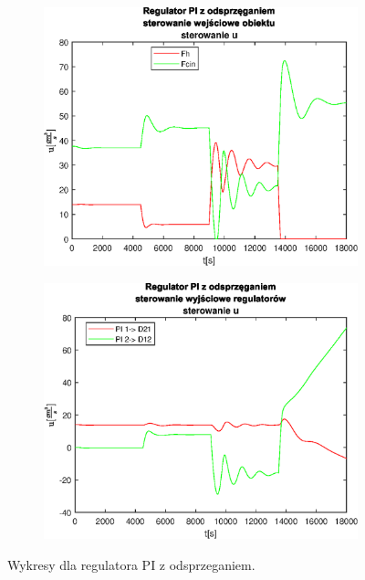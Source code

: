 \begin{figure}[h!]
   \begin{subfigure}[b]{0.4\textwidth}
      \includegraphics[width=1\linewidth]{img/PI/decoupler/noDisturbance/PIDecouplerControl3Linfalse.eps}
      \caption{}
      \label{fig:fig:PIDecoupler3Linfalse3}
   \end{subfigure}
       
   \begin{subfigure}[b]{0.4\textwidth}
      \includegraphics[width=1\linewidth]{img/PI/decoupler/noDisturbance/PIDecouplerControlD3Linfalse.eps}
      \caption{}
      \label{fig:fig:PIDecoupler3Linfalse4}
   \end{subfigure}
       
   \caption{Wykresy dla regulatora PI z odsprzeganiem.}
   \label{fig:PIDecoupler3Linfalse}
\end{figure}
           
